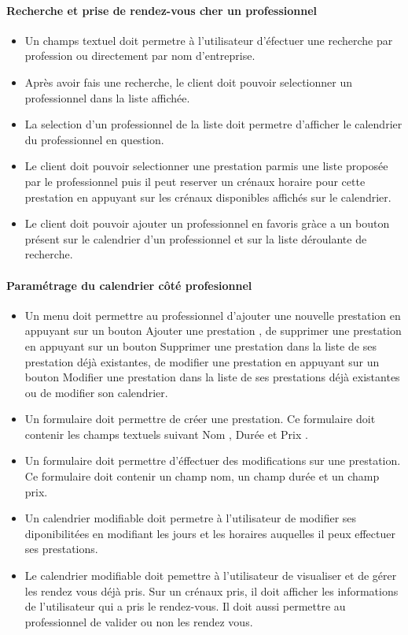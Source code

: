 \documentclass{article}
\begin{document}
\paragraph{Recherche et prise de rendez-vous cher un professionnel}
\begin{itemize}
\item Un champs textuel doit permetre à l'utilisateur d'éfectuer une
  recherche par profession ou directement par nom
  d'entreprise.
\item Après avoir fais une recherche, le client doit pouvoir selectionner un
  professionnel dans la liste affichée. 
\item La selection d'un
  professionnel de la liste doit permetre d'afficher le
  calendrier du professionnel en question.
\item Le client doit pouvoir selectionner une prestation parmis une liste
  proposée par le professionnel puis il peut reserver un crénaux
  horaire pour cette prestation en appuyant sur les crénaux
  disponibles affichés sur le calendrier.
\item Le client doit pouvoir ajouter un professionnel en favoris gràce
  a un bouton présent sur le calendrier d'un professionnel et sur la
  liste déroulante de recherche.
\end{itemize}


\paragraph{Paramétrage du calendrier côté profesionnel}
\begin{itemize}
\item Un menu doit permettre au professionnel d'ajouter une nouvelle
  prestation en appuyant sur un bouton \og Ajouter une prestation \fg{}, de
  supprimer une prestation en appuyant sur un bouton \og Supprimer une
  prestation \fg{} dans la liste de ses prestation déjà existantes, de modifier une prestation en appuyant sur un
  bouton \og Modifier une prestation \fg{} dans la liste de ses
  prestations déjà existantes
  ou de modifier son calendrier. 
\item Un formulaire doit permettre de créer une prestation. Ce
  formulaire doit contenir les champs textuels suivant \og Nom \fg{},
  \og Durée \fg{} et \og Prix \fg{}.  
\item Un formulaire doit permettre d'éffectuer des modifications sur
  une prestation. Ce formulaire doit contenir un champ nom, un champ
  durée et un champ prix.  
\item Un calendrier modifiable doit permetre à l'utilisateur de
  modifier ses diponibilitées en modifiant les jours et les horaires
  auquelles il peux effectuer ses prestations.
\item Le calendrier modifiable doit pemettre à l'utilisateur de
  visualiser et de gérer les rendez vous déjà pris. Sur un crénaux
  pris, il doit afficher les informations de l'utilisateur qui a pris
  le rendez-vous. Il doit aussi permettre au professionnel de valider
  ou non les rendez vous. 
\end{itemize}
\newpage
\end{document}
